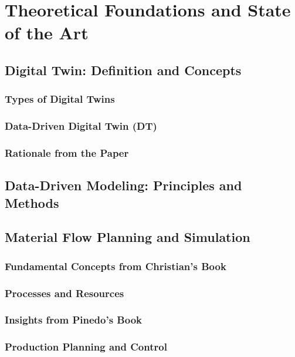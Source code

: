 \chapter{Theoretical Foundations and State of the Art}
\label{chap:theory}

\section{Digital Twin: Definition and Concepts}
\subsection{Types of Digital Twins}
\subsection{Data-Driven Digital Twin (DT)}
\subsection{Rationale from the Paper}

\section{Data-Driven Modeling: Principles and Methods}

\section{Material Flow Planning and Simulation}
\subsection{Fundamental Concepts from Christian's Book}
\subsection{Processes and Resources}
\subsection{Insights from Pinedo's Book}
\subsection{Production Planning and Control}

